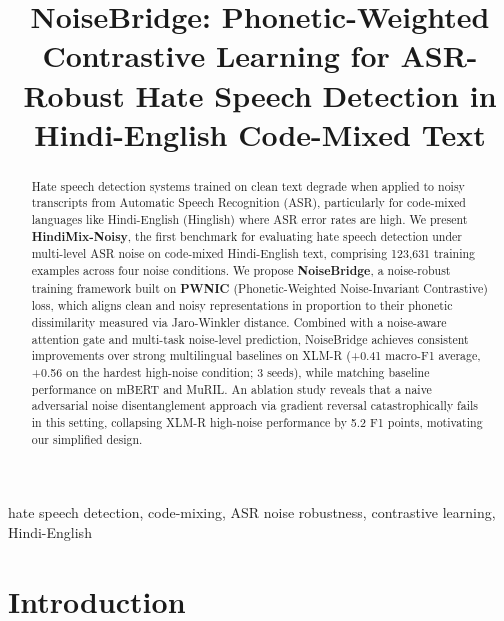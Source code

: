 \documentclass[conference]{IEEEtran}
\begin{document}
\title{NoiseBridge: Phonetic-Weighted Contrastive Learning for ASR-Robust Hate Speech Detection in Hindi-English Code-Mixed Text}

\author{
}

\maketitle

\begin{abstract}
Hate speech detection systems trained on clean text degrade when applied to noisy transcripts from Automatic Speech Recognition (ASR), particularly for code-mixed languages like Hindi-English (Hinglish) where ASR error rates are high. We present \textbf{HindiMix-Noisy}, the first benchmark for evaluating hate speech detection under multi-level ASR noise on code-mixed Hindi-English text, comprising 123,631 training examples across four noise conditions. We propose \textbf{NoiseBridge}, a noise-robust training framework built on \textbf{PWNIC} (Phonetic-Weighted Noise-Invariant Contrastive) loss, which aligns clean and noisy representations in proportion to their phonetic dissimilarity measured via Jaro-Winkler distance. Combined with a noise-aware attention gate and multi-task noise-level prediction, NoiseBridge achieves consistent improvements over strong multilingual baselines on XLM-R (+0.41 macro-F1 average, +0.56 on the hardest high-noise condition; 3 seeds), while matching baseline performance on mBERT and MuRIL. An ablation study reveals that a naive adversarial noise disentanglement approach via gradient reversal catastrophically fails in this setting, collapsing XLM-R high-noise performance by 5.2 F1 points, motivating our simplified design.
\end{abstract}

\begin{IEEEkeywords}
hate speech detection, code-mixing, ASR noise robustness, contrastive learning, Hindi-English
\end{IEEEkeywords}

\section{Introduction}
\end{document}
